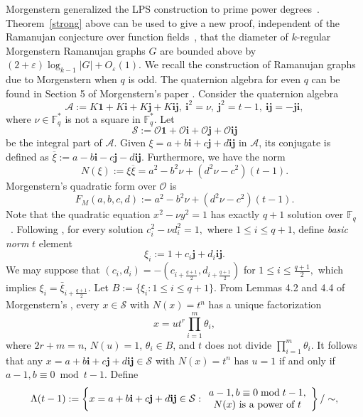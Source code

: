 \documentclass[10pt]{amsart}
\theoremstyle{plain}
\theoremstyle{plain}
\theoremstyle{remark}
\theoremstyle{definition}
\begin{document}
Morgenstern generalized the LPS construction to prime power degrees~\cite{Morgenstern}. 
Theorem~\ref{strong} above can be used to give a new proof, independent of the Ramanujan conjecture over function fields~\cite{Drinfeld}, that the diameter of $k$-regular Morgenstern Ramanujan graphs $G$ are bounded above by $(2+\varepsilon)\log_{k-1}|G|+O_{\varepsilon}(1)$. We recall the construction of Ramanujan graphs due to Morgenstern when $q$ is odd. The quaternion algebra  for even $q$ can be found in Section 5 of Morgenstern's paper \cite{Morgenstern}. Consider the quaternion algebra
$$\mathcal{A}:=K\mathbf{1}+K\mathbf{i}+K\mathbf{j}+K\mathbf{ij},\ \mathbf{i}^2=\nu,\ \mathbf{j}^2=t-1,\ \mathbf{ij}=-\mathbf{ji},$$
where $\nu\in \mathbb{F}_q^*$ is not a square in $\mathbb{F}_q^*.$ Let
$$\mathcal{S}:=\mathcal{O}\mathbf{1}+\mathcal{O}\mathbf{i}+\mathcal{O}\mathbf{j}+\mathcal{O}\mathbf{ij}$$
be the integral part of $\mathcal{A}$. Given $\xi=a+b\mathbf{i}+c\mathbf{j}+d\mathbf{ij}$ in $\mathcal{A}$, its conjugate is defined as $\overline{\xi}:=a-b\mathbf{i}-c\mathbf{j}-d\mathbf{ij}$. Furthermore, we have the norm
$$N(\xi):=\xi\overline{\xi}=a^2-b^2\nu+(d^2\nu-c^2)(t-1).$$ 
Morgenstern's quadratic form over $\mathcal{O}$ is
\begin{equation}\label{Morgquad}
F_M(a,b,c,d):=a^2-b^2\nu+(d^2\nu-c^2)(t-1).
\end{equation}
Note that the quadratic equation $x^2-\nu y^2=1$ has exactly $q+1$ solution over $\mathbb{F}_q$~\cite[Lemma 4.2]{Morgenstern}.
Following \cite[Definition 4.3]{Morgenstern}, for every solution  $c_i^2-\nu d_i^2=1,$ where $1\leq i\leq q+1$, define  \textit{basic norm} $t$ element
\[
\xi_i:=1+c_i\mathbf{j}+d_i\mathbf{ij}.
\]
We may suppose that $(c_i,d_i)=-(c_{i+\frac{q+1}{2}}, d_{i+\frac{q+1}{2}})$ for $1\leq i\leq \frac{q+1}{2},$ which implies $\xi_i=\bar{\xi}_{i+\frac{q+1}{2}}.$ Let \(B:=\{\xi_i:  1\leq i\leq q+1  \}   \). From Lemmas 4.2 and 4.4 of Morgenstern's \cite{Morgenstern}, every  $x\in \mathcal{S}$ with $N(x)=t^n$ has a unique factorization
\begin{equation}\label{xfactor}x=ut^r\prod_{i=1}^m\theta_i ,\end{equation}
where $2r+m=n$, $N(u)=1$, $\theta_i\in B$, and $t$ does not divide $\prod_{i=1}^m\theta_i $. It follows that any $x=a+b\mathbf{i}+c\mathbf{j}+d\mathbf{ij} \in \mathcal{S}$ with $N(x)=t^n$  has $u=1$ if and only if $a-1,b\equiv 0\bmod{t-1}$.  Define
\[\Lambda(t-1):=\left\{x=a+b\mathbf{i}+c\mathbf{j}+d\mathbf{ij}\in\mathcal{S}:\begin{array}{c}a-1,b\equiv 0\bmod{t-1},\\ N(x)\ \textup{is a power of }t\end{array}\right\}/\sim,\]
\end{document}
